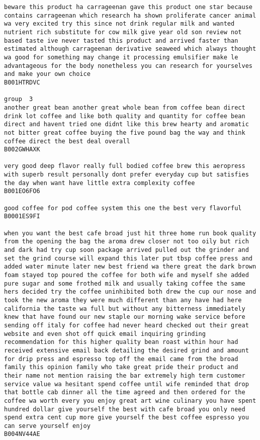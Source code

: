 \documentclass[11pt]{article}
\begin{document}
\begin{Verbatim}[commandchars=\\\{\}]
beware this product ha carrageenan gave this product one star because contains carrageenan which research ha shown proliferate cancer animal wa very excited try this since not drink regular milk and wanted nutrient rich substitute for cow milk give year old son review not based taste ive never tasted this product and arrived faster than estimated although carrageenan derivative seaweed which always thought wa good for something may change it processing emulsifier make le advantageous for the body nonetheless you can research for yourselves and make your own choice
B001HTRDVC

group  3
another great bean another great whole bean from coffee bean direct drink lot coffee and like both quality and quantity for coffee bean direct and havent tried one didnt like this brew hearty and aromatic not bitter great coffee buying the five pound bag the way and think coffee direct the best deal overall
B002GWHAXK

very good deep flavor really full bodied coffee brew this aeropress with superb result personally dont prefer everyday cup but satisfies the day when want have little extra complexity coffee
B001EO6FO6

good coffee for pod coffee system this one the best very flavorful
B0001ES9FI

when you want the best cafe broad just hit three home run book quality from the opening the bag the aroma drew closer not too oily but rich and dark had try cup soon package arrived pulled out the grinder and set the grind course will expand this later put tbsp coffee press and added water minute later new best friend wa there great the dark brown foam stayed top poured the coffee for both wife and myself she added pure sugar and some frothed milk and usually taking coffee the same hers decided try the coffee uninhibited both drew the cup our nose and took the new aroma they were much different than any have had here california the taste wa full but without any bitterness immediately knew that have found our new staple our morning wake service before sending off italy for coffee had never heard checked out their great website and even shot off quick email inquiring grinding recommendation for this higher quality bean roast within hour had received extensive email back detailing the desired grind and amount for drip press and espresso top off the email came from the broad family this opinion family who take great pride their product and their name not mention raising the bar extremely high term customer service value wa hesitant spend coffee until wife reminded that drop that bottle cab dinner all the time agreed and then ordered for the coffee wa worth every you enjoy great art wine culinary you have spent hundred dollar give yourself the best with cafe broad you only need spend extra cent cup more give yourself the best coffee espresso you can serve yourself enjoy
B004NV44AE


\end{Verbatim}
\end{document}
